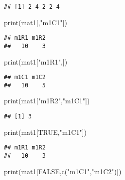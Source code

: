 \documentclass[
]{article}
\newenvironment{Shaded}{\begin{snugshade}}{\end{snugshade}}
\newcommand{\ConstantTok}[1]{\textcolor[rgb]{0.00,0.00,0.00}{#1}}
\newcommand{\FunctionTok}[1]{\textcolor[rgb]{0.00,0.00,0.00}{#1}}
\newcommand{\NormalTok}[1]{#1}
\newcommand{\StringTok}[1]{\textcolor[rgb]{0.31,0.60,0.02}{#1}}
\begin{document}
\begin{verbatim}
## [1] 2 4 2 2 4
\end{verbatim}

\begin{Shaded}
\begin{Highlighting}[]
\FunctionTok{print}\NormalTok{(mat1[,}\StringTok{"m1C1"}\NormalTok{])}
\end{Highlighting}
\end{Shaded}

\begin{verbatim}
## m1R1 m1R2 
##   10    3
\end{verbatim}

\begin{Shaded}
\begin{Highlighting}[]
\FunctionTok{print}\NormalTok{(mat1[}\StringTok{"m1R1"}\NormalTok{,])}
\end{Highlighting}
\end{Shaded}

\begin{verbatim}
## m1C1 m1C2 
##   10    5
\end{verbatim}

\begin{Shaded}
\begin{Highlighting}[]
\FunctionTok{print}\NormalTok{(mat1[}\StringTok{"m1R2"}\NormalTok{,}\StringTok{"m1C1"}\NormalTok{])}
\end{Highlighting}
\end{Shaded}

\begin{verbatim}
## [1] 3
\end{verbatim}

\begin{Shaded}
\begin{Highlighting}[]
\FunctionTok{print}\NormalTok{(mat1[}\ConstantTok{TRUE}\NormalTok{,}\StringTok{"m1C1"}\NormalTok{])}
\end{Highlighting}
\end{Shaded}

\begin{verbatim}
## m1R1 m1R2 
##   10    3
\end{verbatim}

\begin{Shaded}
\begin{Highlighting}[]
\FunctionTok{print}\NormalTok{(mat1[}\ConstantTok{FALSE}\NormalTok{,}\FunctionTok{c}\NormalTok{(}\StringTok{"m1C1"}\NormalTok{,}\StringTok{"m1C2"}\NormalTok{)])}
\end{Highlighting}
\end{Shaded}
\end{document}
